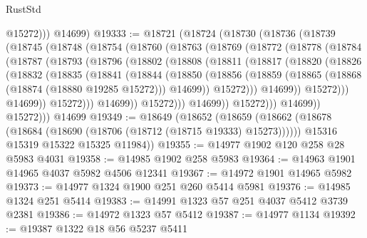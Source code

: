 \begin{lexlean}{RustStd}
\begin{coremodule}
            @15272)))
      @14699)
@19333 := @18721
    (@18724
      (@18730
        (@18736
          (@18739
            (@18745
              (@18748
                (@18754
                  (@18760
                    (@18763
                      (@18769
                        (@18772
                          (@18778
                            (@18784
                              (@18787
                                (@18793
                                  (@18796
                                    (@18802
                                      (@18808
                                        (@18811
                                          (@18817
                                            (@18820
                                              (@18826
                                                (@18832
                                                  (@18835
                                                    (@18841
                                                      (@18844
                                                        (@18850
                                                          (@18856
                                                            (@18859
                                                              (@18865
                                                                (@18868
                                                                  (@18874 (@18880 @19285 @15272)))
                                                                @14699))
                                                            @15272)))
                                                      @14699))
                                                  @15272)))
                                            @14699))
                                        @15272)))
                                  @14699))
                              @15272)))
                        @14699))
                    @15272)))
              @14699))
          @15272)))
    @14699
@19349 := @18649
    (@18652
      (@18659
        (@18662 (@18678 (@18684 (@18690 (@18706 (@18712 (@18715 @19333) @15273))))))
        @15316
        @15319
        @15322
        @15325
        @11984))
@19355 := @14977 @1902 @120 @258 @28 @5983 @4031
@19358 := @14985 @1902 @258 @5983
@19364 := @14963 @1901 @14965 @4037 @5982 @4506 @12341
@19367 := @14972 @1901 @14965 @5982
@19373 := @14977 @1324 @1900 @251 @260 @5414 @5981
@19376 := @14985 @1324 @251 @5414
@19383 := @14991 @1323 @57 @251 @4037 @5412 @3739 @2381
@19386 := @14972 @1323 @57 @5412
@19387 := @14977 @1134
@19392 := @19387 @1322 @18 @56 @5237 @5411

\end{coremodule}
\end{lexlean}
